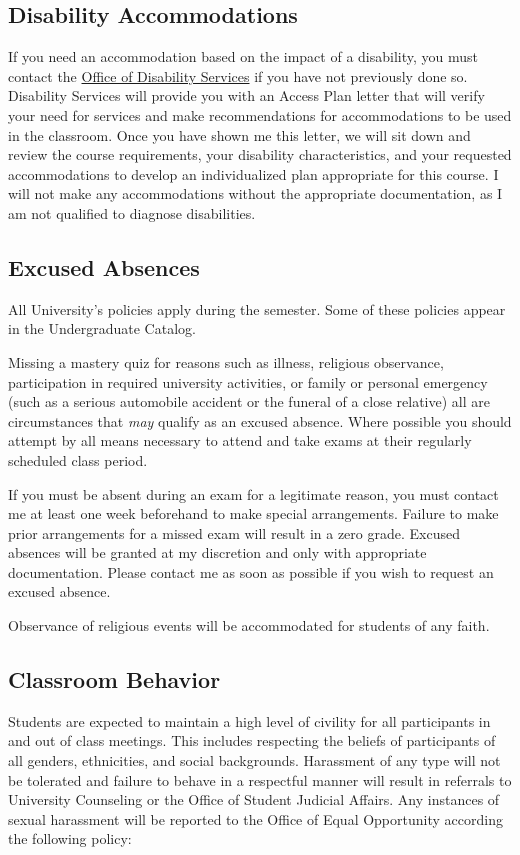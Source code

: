 \documentclass[11pt]{article}
\begin{document}
\subsection{Disability Accommodations}
If you need an accommodation based on the impact of a disability, you must contact 
the \href{https://www.jmu.edu/ods}{Office of Disability Services} if you have not previously done so. 
Disability Services will provide you with an Access Plan letter that will verify your need for services and make recommendations 
for accommodations to be used in the classroom. Once you have shown me this letter, we will sit down and review the 
course requirements, your disability characteristics, and your requested accommodations to develop an individualized plan 
appropriate for this course. I will not make any accommodations without the appropriate documentation, as I am not 
qualified to diagnose disabilities. 

\subsection{Excused Absences}
All University's policies apply during the semester.  Some of these policies appear in the
Undergraduate Catalog.

Missing a mastery quiz for reasons such as illness, religious observance, participation in required university activities, or family or personal emergency (such as a serious automobile accident or the funeral of a close relative) all are circumstances that \textit{may} qualify as an excused absence.  
Where possible you should attempt by all means necessary to attend and take exams at their regularly scheduled class period.  

If you must be absent during an exam for a legitimate reason, you must contact me
 at least one week beforehand to make special
arrangements. Failure to make prior arrangements for a missed exam will result in a zero grade.
Excused absences will be granted at my discretion and only with appropriate documentation. 
Please contact me as soon as possible if you wish to request an excused absence.


Observance of religious events will be accommodated for students of any
faith.


\subsection{Classroom Behavior}
Students are expected to maintain a high level of civility for all
participants in and out of class meetings.  This includes respecting
the beliefs of participants of all genders, ethnicities, and social
backgrounds.  Harassment of any type will not be tolerated and failure
to behave in a respectful manner will result in referrals to
University Counseling or the Office of Student Judicial Affairs.  Any
instances of sexual harassment will be reported to the Office of Equal
Opportunity according the following policy:
\end{document}
